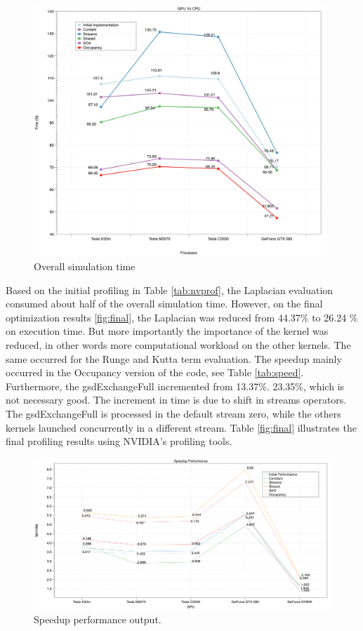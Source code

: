 \begin{figure}[htbp]
	\centering
		\includegraphics[width=0.98\textwidth]{Figures/gpuOptimization.png}
		\smallskip
	\caption[Overall simulation time]{Overall simulation time}
	\label{fig:gpuop}
\end{figure}


Based on the initial profiling in Table \ref{tab:nvprof}, the Laplacian evaluation consumed about half of the overall simulation time. However, on the final optimization results \ref{fig:final}, the Laplacian was reduced from 44.37$\%$ to 26.24 $\%$ on execution time. But more importantly the importance of the kernel was reduced, in other words more computational workload on the other kernels. The same occurred for the Runge and Kutta term evaluation. The speedup mainly occurred in the Occupancy version of the code, see Table \ref{tab:speed}. Furthermore, the {\listf gsdExchangeFull} incremented from 13.37$\%$. 23.35$\%$, which is not necessary good. The increment in time is due to shift in streams operators. The {\listf gsdExchangeFull} is processed in the default stream zero, while the others kernels launched concurrently in a different stream.  Table \ref{fig:final} illustrates the final profiling results using NVIDIA's profiling tools.

\begin{figure}[htbp]
	\centering
		\includegraphics[width=1.0 \textwidth]{Figures/speedup.png}
		\smallskip
	\caption[Speedup performance output]{Speedup performance output.}
	\label{fig:speedup}
\end{figure}


